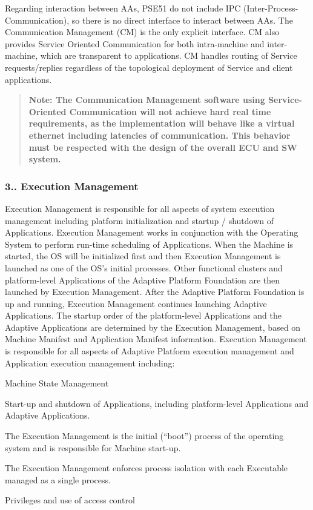 Regarding interaction between A\+As, P\+S\+E51 do not include I\+PC (Inter-\/\+Process-\/\+Communication), so there is no direct interface to interact between A\+As. The Communication Management (CM) is the only explicit interface. CM also provides Service Oriented Communication for both intra-\/machine and inter-\/machine, which are transparent to applications. CM handles routing of Service requests/replies regardless of the topological deployment of Service and client applications.

\begin{quote}
{\bfseries Note\+: The Communication Management software using Service-\/\+Oriented Communication will not achieve hard real time requirements, as the implementation will behave like a virtual ethernet including latencies of communication. This behavior must be respected with the design of the overall E\+CU and SW system.} \end{quote}


\subsubsection*{3.. Execution Management}

Execution Management is responsible for all aspects of system execution management including platform initialization and startup / shutdown of Applications. Execution Management works in conjunction with the Operating System to perform run-\/time scheduling of Applications.  When the Machine is started, the OS will be initialized first and then Execution Management is launched as one of the O\+S’s initial processes. Other functional clusters and platform-\/level Applications of the Adaptive Platform Foundation are then launched by Execution Management. After the Adaptive Platform Foundation is up and running, Execution Management continues launching Adaptive Applications. The startup order of the platform-\/level Applications and the Adaptive Applications are determined by the Execution Management, based on Machine Manifest and Application Manifest information.  Execution Management is responsible for all aspects of Adaptive Platform execution management and Application execution management including\+:


\begin{DoxyItemize}
\item Machine State Management
\item Start-\/up and shutdown of Applications, including platform-\/level Applications and Adaptive Applications.
\item The Execution Management is the initial (“boot”) process of the operating system and is responsible for Machine start-\/up.
\item The Execution Management enforces process isolation with each Executable managed as a single process.
\item Privileges and use of access control
\end{DoxyItemize}

